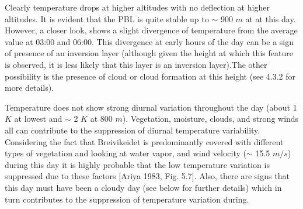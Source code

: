 \documentclass[a4paper,12pt]{article}
\numberwithin{equation}{section} %
\begin{document}
\vspace{1cm}

Clearly temperature drops at higher altitudes with no deflection at higher altitudes. It is evident that the PBL is quite stable up to $\sim$ 900 $m$ at at this day. However, a closer look, shows a slight divergence of temperature from the average value at 03:00 and 06:00. This divergence at early hours of the day can be a sign of presence of an inversion layer (although given the height at which this feature is observed, it is less likely that this layer is an inversion layer).The other possibility is the presence of cloud or cloud formation at this height (see 4.3.2 for more details). 

Temperature does not show strong diurnal variation throughout the day (about 1 $K$ at lowest and $\sim$ 2 $K$ at 800 $m$). Vegetation, moisture, clouds, and strong winds all can contribute to the suppression of diurnal temperature variability. Considering the fact that Breivikeidet is predominantly covered with different types of vegetation and looking at water vapor, and wind velocity ($\sim$ 15.5 $m/s$) during this day it is highly probable that the low temperature variation is suppressed due to these factors [Ariya 1983, Fig. 5.7]. Also, there are signs that this day must have been a cloudy day (see below for further details) which in turn contributes to the suppression of temperature variation during.

\end{document}

